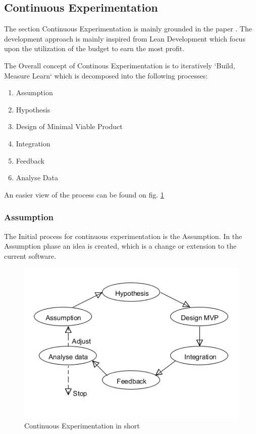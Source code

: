 \documentclass{sig-alternate}
\begin{document}
\subsection{Continuous Experimentation}
The section Continuous Experimentation is mainly grounded in the paper \cite{bowman:reasoning}.
The development approach is mainly inspired from Lean Development which focus upon the utilization of the budget to earn the most profit.

The Overall concept of Continous Experimentation is to iteratively `Build, Measure Learn` which is
decomposed into the following processes: 
\begin{enumerate}
\item Assumption
\item Hypothesis
\item Design of Minimal Viable Product
\item Integration
\item Feedback
\item Analyse Data
\end{enumerate}

An easier view of the process can be found on fig. \ref{fig:continuousdev}

\subsubsection{Assumption}
\label{cx:assumption}
The Initial process for continuous experimentation is the Assumption.
In the Assumption phase an idea is created, which is a change or extension to the current software.

\begin{figure}
\centering
\caption{Continuous Experimentation in short}
\label{fig:continuousdev}
\includegraphics[scale=0.5]{Umlet/conexp}
\end{figure}
\end{document}

